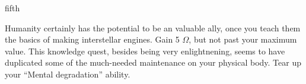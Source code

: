 \documentclass[notebook]{guildcamp1}
\begin{document}
\begin{page}{fifth}

Humanity certainly has the potential to be an valuable ally, once you teach them the basics of making interstellar engines.
Gain 5 $\Omega$, but not past your maximum value. This knowledge quest, besides being very enlightnening, seems to have duplicated some of the much-needed maintenance on your physical body. Tear up your ``Mental degradation'' ability.

\end{page}

\endnotebook
\end{document}
